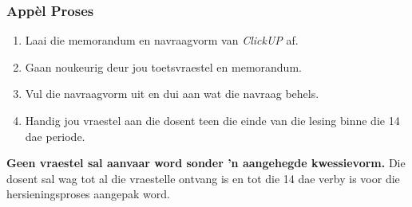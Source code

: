     \subsubsection{App\`{e}l Proses}
    \begin{enumerate}
                \item Laai die memorandum en navraagvorm van \textit{ClickUP} af.
                \item Gaan noukeurig deur jou toetsvraestel en memorandum.
                \item Vul die navraagvorm uit en dui aan wat die
                  navraag behels.
                \item Handig jou vraestel aan die dosent teen die
                  einde van die lesing binne die 14 dae periode.
            \end{enumerate}

            \textbf{Geen vraestel sal aanvaar word sonder 'n
              aangehegde kwessievorm.}  Die dosent sal wag tot al die
            vraestelle ontvang is en tot die 14 dae verby is voor die
            hersieningsproses aangepak word.

        


